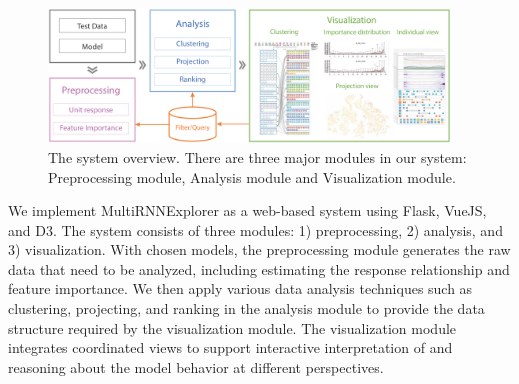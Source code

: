 \begin{figure}[t]
	\centering
    \includegraphics[width=0.95\textwidth]{figure/MultiRNNExplorer/System_framework.pdf}
	\vspace{-3mm}
	\caption{The system overview. There are three major modules in our system: Preprocessing module, Analysis module and Visualization module. 
	}
	\label{fig:system_framework}
	\vspace{-4mm}
\end{figure}


We implement MultiRNNExplorer as a web-based system using Flask, VueJS, and D3. 
The system consists of three modules: 1) preprocessing, 2) analysis, and 3) visualization.
With chosen models, the preprocessing module generates the raw data that need to be analyzed, including estimating the response relationship and feature importance.
We then apply various data analysis techniques such as clustering, projecting, and ranking in the analysis module to provide the data structure required by the visualization module.
The visualization module integrates coordinated views to support interactive interpretation of and reasoning about the model behavior at different perspectives. 



